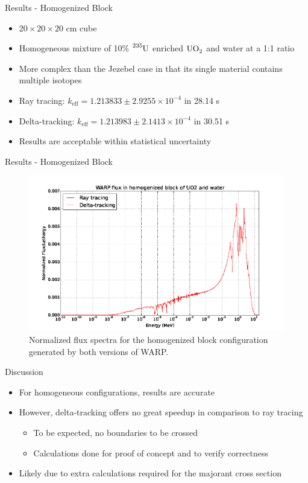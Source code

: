\documentclass[xcolor=x11names, compress, handout]{beamer}
\renewcommand{\(}{\begin{columns}}
\renewcommand{\)}{\end{columns}}
\newcommand{\<}[1]{\begin{column}{#1}}
\renewcommand{\>}{\end{column}}
\begin{document}
\begin{frame}{Results - Homogenized Block}
	\begin{itemize}
	\item{$20\times20\times20$ cm cube}
	\pause
	\item{Homogeneous mixture of 10\% $\ce{^{235}U}$ enriched $\ce{UO_2}$ and water at a 1:1 ratio}
	\pause
	\item{More complex than the Jezebel case in that its single material contains multiple isotopes}
	\pause
	\item{Ray tracing: $k_{\mathrm{eff}} = 1.213833 \pm 2.9255 \times 10^{-4}$ in 28.14 s}
	\pause
	\item{Delta-tracking: $k_{\mathrm{eff}} = 1.213983 \pm 2.1413 \times 10^{-4}$ in 30.51 s}
	\pause
	\item{Results are acceptable within statistical uncertainty}
	\end{itemize}
\end{frame}


\begin{frame}{Results - Homogenized Block}
	\begin{figure}[h!]
	\includegraphics[width=0.9\linewidth]{../figs/homfuel}
	\caption*{Normalized flux spectra for the homogenized block configuration generated by both 
	versions of WARP. \label{homfuel}}
	\end{figure}
\end{frame}


\begin{frame}{Discussion}
	\begin{itemize}
	\item{For homogeneous configurations, results are accurate}
	\pause
	\item{However, delta-tracking offers no great speedup in comparison to ray tracing}
		\begin{itemize}
		\pause
		\item{To be expected, no boundaries to be crossed}
		\pause
		\item{Calculations done for proof of concept and to verify correctness}
		\end{itemize}
	\pause
	\item{Likely due to extra calculations required for the majorant cross section}
	\end{itemize}
\end{frame}
\end{document}
